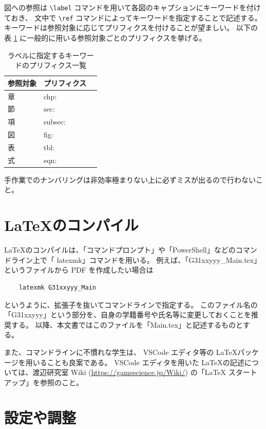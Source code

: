図への参照は \verb+\label+ コマンドを用いて各図のキャプションにキーワードを付けておき、
文中で \verb+\ref+ コマンドによってキーワードを指定することで記述する。
キーワードは参照対象に応じてプリフィクスを付けることが望ましい。
以下の表 \ref{tbl:pre_list} に一般的に用いる参照対象ごとのプリフィクスを挙げる。

\begin{table}[H]
  \caption{ラベルに指定するキーワードのプリフィクス一覧}
  \label{tbl:pre_list}
  \centering
  \begin{tabular}{|l|l|r|} \hline
   参照対象	& プリフィクス \\ \hline
   章		& chp: \\ \hline
   節		& sec: \\ \hline
   項		& subsec: \\ \hline
   図		& fig: \\ \hline
   表 		& tbl: \\ \hline
   式   	& eqn: \\ \hline
  \end{tabular}
\end{table}
手作業でのナンバリングは非効率極まりない上に必ずミスが出るので行わないこと。

\section{\LaTeX のコンパイル}
\LaTeX のコンパイルは、「コマンドプロンプト」や「PowerShell」などのコマンドライン上で「
latexmk」コマンドを用いる。
例えば、「G31xxyyy\_Main.tex」というファイルから PDF を作成したい場合は
\begin{verbatim}
    latexmk G31xxyyy_Main
\end{verbatim}
というように、拡張子を抜いてコマンドラインで指定する。
このファイル名の「G31xxyyy」という部分を、自身の学籍番号や氏名等に変更しておくことを推奨する。
以降、本文書ではこのファイルを「Main.tex」と記述するものとする。

また、コマンドラインに不慣れな学生は、
VSCode エディタ等の \LaTeX パッケージを用いることも良案である。
VSCode エディタを用いた \LaTeX の記述については、渡辺研究室 Wiki
(\url{https://gamescience.jp/Wiki/}) の「LaTeX スタートアップ」を参照のこと。

\section{設定や調整}

